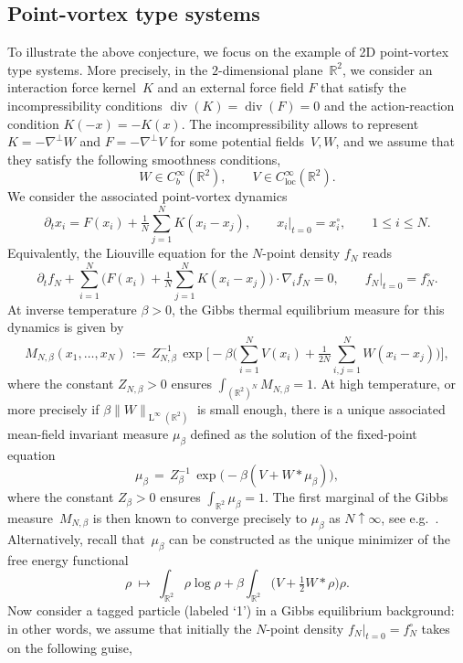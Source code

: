 \documentclass[a4paper,11pt,reqno,noindent]{amsart}
\theoremstyle{plain}
\numberwithin{equation}{section}
\newcommand{\R}{\mathbb R}
\newcommand{\loc}{{\operatorname{loc}}}
\newcommand{\Div}{{\operatorname{div}}}
\newcommand{\3}{|\!|\!|}
\newcommand{\Ld}{\operatorname{L}}
\begin{document}
\subsection{{Point-vortex type} systems}
To illustrate the above conjecture, we focus on the example of 2D {point-vortex type systems}.
More precisely, in the $2$-dimensional plane~$\R^2$, we consider an interaction force kernel~$K$ and an external force field $F$ that satisfy the incompressibility conditions $\Div(K)=\Div(F)=0$ and the action-reaction condition $K(-x)=-K(x)$. The incompressibility allows to represent $K=-\nabla^\bot W$ and $F=-\nabla^\bot V$ for some potential fields~$V,W$, and we assume that they satisfy the following smoothness conditions,
\[W\in C^\infty_b(\R^2),\qquad V\in C^\infty_\loc(\R^2).\]
We consider the associated point-vortex dynamics
\[\partial_tx_i=F(x_i)+\tfrac1N\sum_{j=1}^NK(x_i-x_j),\qquad x_i|_{t=0}=x_i^\circ,\qquad1\le i\le N.\]
Equivalently, the Liouville equation for the $N$-point density $f_N$ reads
\begin{equation}\label{eq:Liouville-2}
\partial_tf_N+\sum_{i=1}^N\Big(F(x_i)+\tfrac1N\sum_{j=1}^NK(x_i-x_j)\Big)\cdot\nabla_if_N=0,\qquad f_N|_{t=0}=f_N^\circ.
\end{equation}
At inverse temperature $\beta>0$, the Gibbs thermal equilibrium measure for this dynamics is given by
\begin{equation}\label{eq:Gibbs}
M_{N,\beta}(x_1,\ldots,x_N)\,:=\,Z_{N,\beta}^{-1}\,\exp\bigg[-\beta\bigg(\sum_{i=1}^NV(x_i)+\tfrac1{2N}\sum_{i,j=1}^NW(x_i-x_j)\bigg)\bigg],
\end{equation}
where the constant $Z_{N,\beta}>0$ ensures $\int_{(\R^2)^N}M_{N,\beta}=1$.
{At high temperature, or more precisely} if $\beta\|W\|_{\Ld^\infty(\R^2)}$ is small enough, there is a unique associated mean-field invariant measure $\mu_\beta$ defined as the solution of the fixed-point equation
\begin{equation}\label{eq:mubeta}
\mu_\beta\,=\,Z_\beta^{-1}\,\exp\big(-\beta (V+ W\ast\mu_\beta)\big),
\end{equation}
where the constant $Z_{\beta}>0$ ensures $\int_{\R^2}\mu_{\beta}=1$.
The first marginal of the Gibbs measure~$M_{N,\beta}$ is then known to converge precisely to $\mu_\beta$ as $N\uparrow\infty$, see e.g.~\cite{Benarous-Brunaud-90}. Alternatively, recall that~$\mu_\beta$ can be constructed as the unique minimizer of the free energy functional
\[\rho~\mapsto~\int_{\R^2} \rho \log \rho +\beta \int_{\R^2} \big(V+\tfrac12 W\ast \rho\big)\rho.\]
Now consider a tagged particle (labeled `1') in a Gibbs equilibrium background: in other words, we assume that initially the $N$-point density $f_N|_{t=0}=f_N^\circ$ takes on the following guise,
\end{document}
